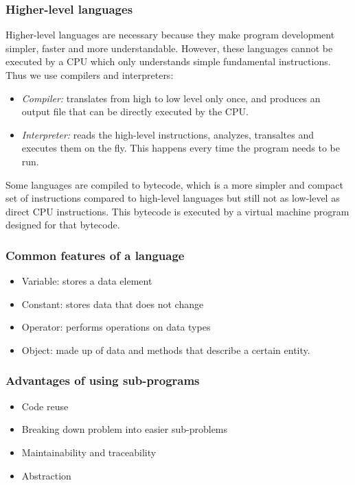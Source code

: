 \documentclass{article}
\begin{document}
\subsubsection{Higher-level languages}
Higher-level languages are necessary because they make program development
simpler, faster and more understandable. However, these languages cannot be
executed by a CPU which only understands simple fundamental instructions.
Thus we use compilers and interpreters:
\begin{itemize}
    \item \textit{Compiler:} translates from high to low level only once, and
        produces an output file that can be directly executed by the CPU.
    \item \textit{Interpreter:} reads the high-level instructions, analyzes,
        transaltes and executes them on the fly. This happens every time the
        program needs to be run.
\end{itemize}
Some languages are compiled to bytecode, which is a more simpler and compact
set of instructions compared to high-level languages but still not as low-level
as direct CPU instructions. This bytecode is executed by a virtual machine
program designed for that bytecode.

\subsubsection{Common features of a language}
\begin{itemize}
    \item Variable: stores a data element
    \item Constant: stores data that does not change
    \item Operator: performs operations on data types
    \item Object: made up of data and methods that describe a certain entity.
\end{itemize}

\subsubsection{Advantages of using sub-programs}
\begin{itemize}
    \item Code reuse
    \item Breaking down problem into easier sub-problems
    \item Maintainability and traceability
    \item Abstraction
\end{itemize}
\end{document}

